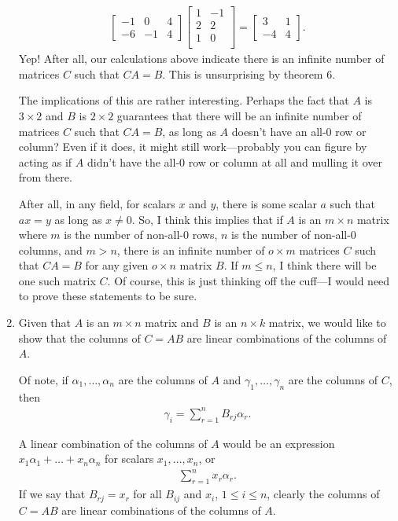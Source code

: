 \documentclass[12pt]{article}
\begin{document}
\begin{enumerate}
\begin{align*}
\begin{bmatrix}
        -1 &  0 & 4\\
        -6 & -1 & 4
      \end{bmatrix}
      \begin{bmatrix}
        1 & -1\\
        2 &  2\\
        1 &  0\\
      \end{bmatrix}
      =
      \begin{bmatrix}
        3  & 1\\
        -4 & 4
      \end{bmatrix}.
    \end{align*}
    Yep! After all, our calculations above indicate there is an
    infinite number of matrices $C$ such that $CA = B$. This is
    unsurprising by theorem 6.

    The implications of this are rather interesting. Perhaps the
    fact that $A$ is $3 \times 2$ and $B$ is $2 \times 2$
    guarantees that there will be an infinite number of matrices
    $C$ such that $CA = B$, as long as $A$ doesn't have an all-0
    row or column? Even if it does, it might still work—probably
    you can figure by acting as if $A$ didn't have the all-0 row
    or column at all and mulling it over from there.

    After all, in any field, for scalars $x$ and $y$, there is
    some scalar $a$ such that $ax = y$ as long as $x \neq 0$. So,
    I think this implies that if $A$ is an $m \times n$ matrix
    where $m$ is the number of non-all-0 rows, $n$ is the number
    of non-all-0 columns, and $m > n$, there is an infinite
    number of $o \times m$ matrices $C$ such that $CA = B$ for
    any given $o \times n$ matrix $B$. If $m \leq n$, I think
    there will be one such matrix $C$. Of course, this is just
    thinking off the cuff—I would need to prove these statements
    to be sure.

  \item
    Given that $A$ is an $m \times n$ matrix and $B$ is an $n
    \times k$ matrix, we would like to show that the columns of
    $C = AB$ are linear combinations of the columns of $A$.

    Of note, if $\alpha_1,\ldots,\alpha_n$ are the columns of
    $A$ and $\gamma_1,\ldots,\gamma_n$ are the columns of $C$,
    then
    \begin{align*}
      \gamma_i = \sum_{r = 1}^{n} B_{rj}\alpha_r.
    \end{align*}

    A linear combination of the columns of $A$ would be an
    expression $x_1\alpha_1 + \ldots + x_n\alpha_n$ for scalars
    $x_1,\ldots,x_n$, or
    \begin{align*}
      \sum_{r = 1}^{n} x_r\alpha_r.
    \end{align*}
    If we say that $B_{rj} = x_r$ for all $B_{ij}$ and $x_i$, $1
    \leq i \leq n$, clearly the columns of $C = AB$ are linear
    combinations of the columns of $A$.
\end{enumerate}
\end{document}
